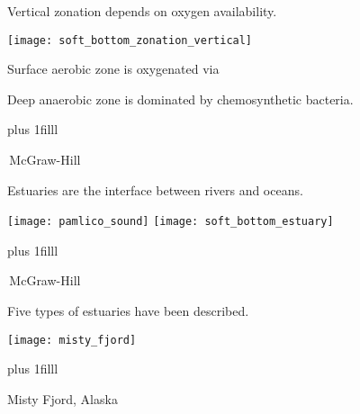 \documentclass[t]{beamer}
\begin{document}
\begin{frame}[t]{Vertical zonation depends on oxygen availability.}

\vspace*{-\baselineskip}

\begin{multicols}{2}

	\begin{center}
		\texttt{[image: soft\_bottom\_zonation\_vertical]}
	\end{center}

\columnbreak

	\hangpara Surface aerobic zone is oxygenated via 
	
	\hangpara Deep anaerobic zone is dominated by chemosynthetic bacteria.

\end{multicols}

	\vspace*{-0.5\baselineskip}
	
	\vskip0pt plus 1filll

	\tiny\textcopyright\,McGraw-Hill

\end{frame}
%
\begin{frame}[t]{Estuaries are the interface between rivers and oceans.}

	\texttt{[image: pamlico\_sound]}\hfill
	\texttt{[image: soft\_bottom\_estuary]}
	
	\vskip0pt plus 1filll

	\hfill\tiny\textcopyright\,McGraw-Hill

\end{frame}
%
\begin{frame}[t]{Five types of estuaries have been described.}
	
	\vspace*{-\baselineskip}
	
	\begin{multicols}{2}
		\begin{center}
			\texttt{[image: misty\_fjord]}
		\end{center}
	\columnbreak
	
		\hangpara{}
		
		\hangpara{}
		
		\hangpara{}
		
		\hangpara{}
		
		\hangpara{}
		
	\end{multicols}

	\vskip0pt plus 1filll

	\tiny Misty Fjord, Alaska
\end{frame}
\end{document}
